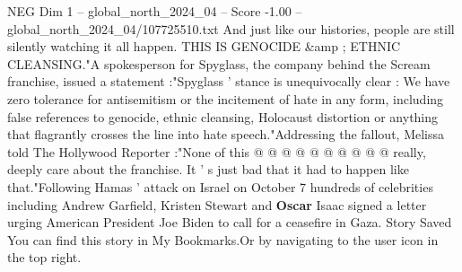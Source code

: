 \begin{textsample}{NEG Dim 1 – global\_north\_2024\_04 – Score -1.00 – global\_north\_2024\_04/107725510.txt}
And just like our histories, people are still silently watching it all happen.
THIS IS GENOCIDE \&amp ; ETHNIC CLEANSING."A spokesperson for Spyglass, the company behind the Scream franchise, issued a statement :"Spyglass ' stance is unequivocally clear : We have zero tolerance for antisemitism or the incitement of hate in any form, including false references to genocide, ethnic cleansing, Holocaust distortion or anything that flagrantly crosses the line into hate speech."Addressing the fallout, Melissa told The Hollywood Reporter :"None of this @ @ @ @ @ @ @ @ @ @ really, deeply care about the franchise.
It ' s just bad that it had to happen like that."Following Hamas ' attack on Israel on October 7 hundreds of celebrities including Andrew Garfield, Kristen Stewart and \textbf{Oscar} Isaac signed a letter urging American President Joe Biden to call for a ceasefire in Gaza.
Story Saved You can find this story in My Bookmarks.Or by navigating to the user icon in the top right.

\end{textsample}
